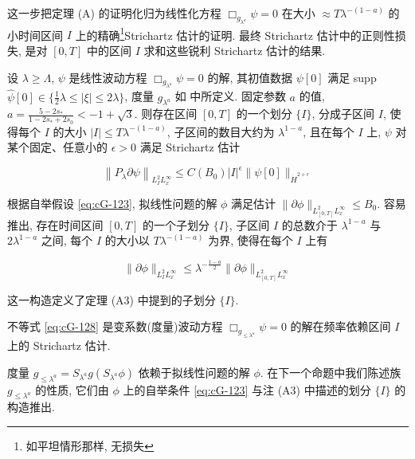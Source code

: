 
这一步把定理 (A) 的证明化归为线性化方程 $\Box_{g_{\lambda^a}} \psi = 0$ 在大小 $\approx T\lambda^{-(1-a)}$ 的小时间区间 $I$ 上的精确\footnote{如平坦情形那样, 无损失}Strichartz 估计的证明. 最终 Strichartz 估计中的正则性损失, 是对 $[0,  T]$ 中的区间 $I$ 求和这些锐利 Strichartz 估计的结果. 

\begin{theorem}[A3]\label{thm:cG-6.12}
设 $\lambda \geq \Lambda$, $\psi$ 是线性波动方程 $\Box_{g_{\lambda^a}}\psi = 0$ 的解, 其初值数据 $\psi [0]$ 满足 supp $\hat{\psi}[0] \in \{\frac{1}{2}\lambda \leq |\xi| \leq 2\lambda\}$, 度量 $g_{\lambda^a}$ 如  中所定义. 固定参数 $a$ 的值, $a = \frac{5 - 2s_*}{1 - 2s_* + 2s_0} < -1 + \sqrt{3}$. 则存在区间 $[0,  T]$ 的一个划分 $\{I\}$, 分成子区间 $I$, 使得每个 $I$ 的大小 $|I| \leq T\lambda^{-(1 - a)}$, 子区间的数目大约为 $\lambda^{1 - a}$, 且在每个 $I$ 上, $\psi$ 对某个固定、任意小的 $\epsilon > 0$ 满足 Strichartz 估计

\begin{equation}
\left\|P_{\lambda}\partial\psi\right\|_{L_{I}^{2}L_{x}^{\infty}} \leq C(B_{0})|I|^{\epsilon}\|\psi[0]\|_{\dot{H}^{2 + \epsilon}}\label{eq:cG-128}
\end{equation}
\end{theorem}

\begin{remark*}[A3]
根据自举假设 \eqref{eq:cG-123}, 拟线性问题的解 $\phi$ 满足估计 $\|\partial\phi\|_{L^{2}_{[0, T]} L_x^\infty} \leq B_0$. 容易推出, 存在时间区间 $[0, T]$ 的一个子划分 $\{I\}$, 子区间 $I$ 的总数介于 $\lambda^{1 - a}$ 与 $2\lambda^{1 - a}$ 之间, 每个 $I$ 的大小以 $T\lambda^{-(1 - a)}$ 为界, 使得在每个 $I$ 上有

\begin{equation}
\|\partial\phi\|_{L_{I}^{2}L_{x}^{\infty}} \leq \lambda^{-\frac{1 - a}{2}}\|\partial\phi\|_{L_{[0, T]}^{2}L_{x}^{\infty}}\label{eq:cG-129}
\end{equation}

这一构造定义了定理 (A3) 中提到的子划分 $\{I\}$. 
\end{remark*}


不等式 \eqref{eq:cG-128} 是变系数(度量)波动方程 $\Box_{g_{\leq\lambda^{a}}}\psi=0$ 的解在频率依赖区间 $I$ 上的 Strichartz 估计. 

度量 $g_{\leq\lambda^{a}} = S_{\lambda^{a}}g(S_{\lambda^{a}}\phi)$ 依赖于拟线性问题的解 $\phi$. 在下一个命题中我们陈述族 $g_{\leq\lambda^{a}}$ 的性质, 它们由 $\phi$ 上的自举条件 \eqref{eq:cG-123} 与注 (A3) 中描述的划分 $\{I\}$ 的构造推出. 

